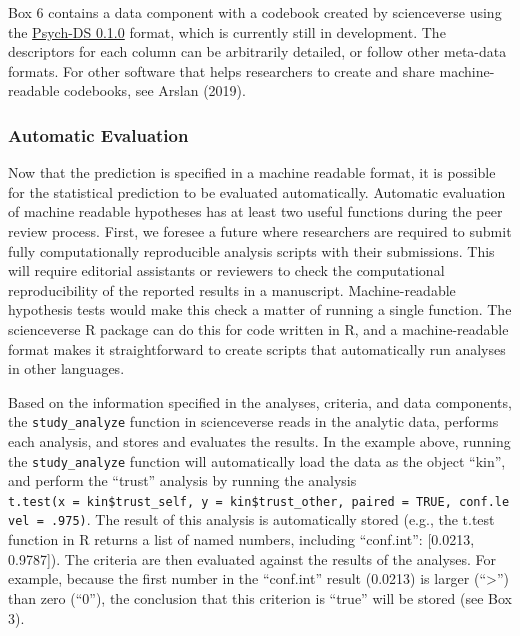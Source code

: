 \documentclass[
  english,
  doc,floatsintext]{apa6}
\begin{document}
Box 6 contains a data component with a codebook created by scienceverse using the \href{https://docs.google.com/document/d/1u8o5jnWk0Iqp_J06PTu5NjBfVsdoPbBhstht6W0fFp0/edit\#heading=h.caxnnxqaobj}{Psych-DS 0.1.0} format, which is currently still in development. The descriptors for each column can be arbitrarily detailed, or follow other meta-data formats. For other software that helps researchers to create and share machine-readable codebooks, see Arslan (2019).

\hypertarget{automatic-evaluation}{%
\subsubsection{Automatic Evaluation}\label{automatic-evaluation}}

Now that the prediction is specified in a machine readable format, it is possible for the statistical prediction to be evaluated automatically. Automatic evaluation of machine readable hypotheses has at least two useful functions during the peer review process. First, we foresee a future where researchers are required to submit fully computationally reproducible analysis scripts with their submissions. This will require editorial assistants or reviewers to check the computational reproducibility of the reported results in a manuscript. Machine-readable hypothesis tests would make this check a matter of running a single function. The scienceverse R package can do this for code written in R, and a machine-readable format makes it straightforward to create scripts that automatically run analyses in other languages.

Based on the information specified in the analyses, criteria, and data components, the \texttt{study\_analyze} function in scienceverse reads in the analytic data, performs each analysis, and stores and evaluates the results. In the example above, running the \texttt{study\_analyze} function will automatically load the data as the object \enquote{kin}, and perform the \enquote{trust} analysis by running the analysis \texttt{t.test(x\ =\ kin\$trust\_self,\ y\ =\ kin\$trust\_other,\ paired\ =\ TRUE,\ conf.level\ =\ .975)}. The result of this analysis is automatically stored (e.g., the t.test function in R returns a list of named numbers, including \enquote{conf.int}: {[}0.0213, 0.9787{]}). The criteria are then evaluated against the results of the analyses. For example, because the first number in the \enquote{conf.int} result (0.0213) is larger (\enquote{\textgreater{}}) than zero (\enquote{0}), the conclusion that this criterion is \enquote{true} will be stored (see Box 3).
\end{document}
